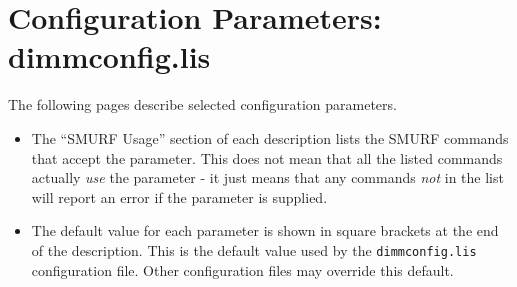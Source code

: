 \documentclass[twoside,11pt]{article}
\newcommand{\xlabel}[1]{}
\renewcommand{\_}{\texttt{\symbol{95}}}
\begin{document}
\section{\xlabel{par_full}Configuration Parameters: dimmconfig.lis}
\label{app:par_full}

The following pages describe selected configuration parameters.

\begin{itemize}
\item The ``SMURF Usage'' section of each description lists the SMURF
commands that accept the parameter. This does not mean that all the
listed commands actually \emph{use} the parameter - it just means that
any commands \emph{not} in the list will report an error if the parameter
is supplied.
\item The default value for each parameter is shown in square brackets at
the end of the description. This is the default value used by the
\texttt{dimmconfig.lis} configuration file. Other configuration
files may override this default.
\end{itemize}
\end{document}

